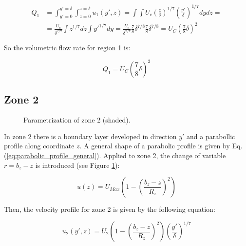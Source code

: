 \begin{equation}
\begin{split}
Q_1 &= \int_{y'=0}^{y'=\delta} \int_{z=0}^{z=\delta} u_1 \left( y', z  \right) = \int \int U_c \left( \frac{z}{\delta} \right)^{1/7} \left( \frac{y'}{\delta} \right)^{1/7} dy dz = \\
&= \frac{U_c}{\delta^{2/7}} \int z^{1/7} dz \int y'^{1/7} dy = \frac{U_c}{\delta^{2/7}} \frac{7}{8} \delta^{7/8} \frac{7}{8} \delta^{7/8} = U_C \left( \frac{7}{8} \delta \right)^2
\end{split}
\end{equation}

So the volumetric flow rate for region 1 is:

\begin{equation}
\label{eq:3DBL_Q1}
\boxed{
Q_1 = U_C \left( \frac{7}{8} \delta \right)^2
}
\end{equation}


\newpage

\subsection{Zone 2}

\begin{figure}[h!]	
	\centering
%	
	\caption{Parametrization of zone 2 (shaded).}
	\label{fig:param_z2}
\end{figure}

In zone 2 there is a boundary layer developed in direction $y'$ and a parabollic profile along coordinate $z$. A general shape of a parabolic profile is given by Eq. (\ref{eq:parabolic_profile_general}). Applied to zone 2, the change of variable $r = b_z - z$ is introduced (see Figure \ref{fig:param_z2}):

\begin{equation}
u \left( z \right) = U_{Max} \left( 1 - \left( \frac{b_z - z}{R_z} \right)^2 \right)
\end{equation}

Then, the velocity profile for zone 2 is given by the following equation:

\begin{equation}
\label{eq:3DBL_profile_u2}
\boxed{
u_2 \left( y', z \right) = U_2 \left( 1 - \left( \frac{b_z - z}{R_z} \right)^2 \right) \left( \frac{y'}{\delta} \right)^{1/7}
}
\end{equation}

